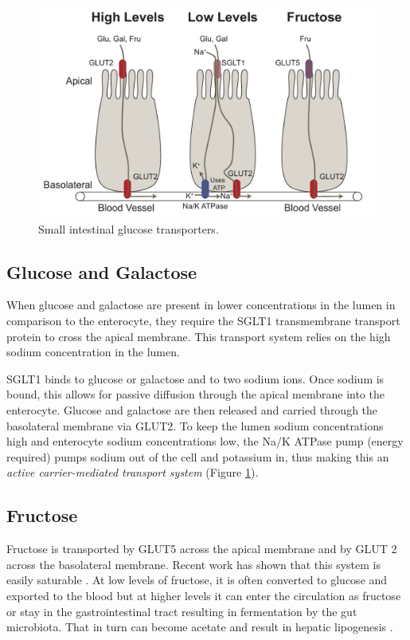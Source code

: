 \documentclass{tufte-handout}
\begin{document}
\begin{figure}
\includegraphics{figures/glucose-intestine.pdf}
\caption{Small intestinal glucose transporters.}
\label{fig:glucose-intestine}
\end{figure}


\subsection{Glucose and Galactose}

When glucose and galactose are present in lower concentrations in the lumen in comparison to the enterocyte, they require the SGLT1 transmembrane transport protein to cross the apical membrane. This transport system relies on the high sodium concentration in the lumen.

SGLT1 binds to glucose or galactose and to two sodium ions. Once sodium is bound, this allows for passive diffusion through the apical membrane into the enterocyte. Glucose and galactose are then released and carried through the basolateral membrane via GLUT2. To keep the lumen sodium concentrations high and enterocyte sodium concentrations low, the Na/K ATPase pump (energy required) pumps sodium out of the cell and potassium in, thus making this an \emph{active carrier-mediated transport system}
(Figure \ref{fig:glucose-intestine})\emph{.}

\subsection{Fructose}

Fructose is transported by GLUT5 across the apical membrane and by GLUT 2 across the basolateral membrane.  Recent work has shown that this system is easily saturable \citep{Jang2018}.  At low levels of fructose, it is often converted to glucose and exported to the blood but at higher levels it can enter the circulation as fructose or stay in the gastrointestinal tract resulting in fermentation by the gut microbiota.  That in turn can become acetate and result in hepatic lipogenesis \citep{Zhao2020a}.
\end{document}
